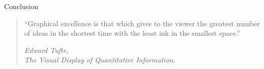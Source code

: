 \documentclass[10pt,aspectratio=169]{beamer}
\begin{document}



\begin{frame}{Conclusion}

  \begin{quote}
    ``Graphical excellence is that which gives to the viewer the
    greatest number of ideas in the shortest time with the least ink
    in the smallest space.''
    \begin{flushright}
      {\em \small Edward Tufte,\\
        The Visual Display of Quantitative Information.\par }
    \end{flushright}
      \end{quote}
\end{frame}
\end{document}

